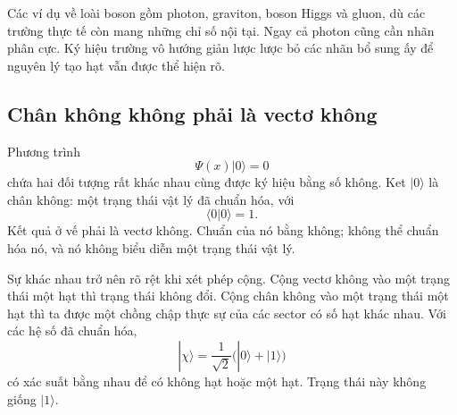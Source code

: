 \begin{classroomqa}\end{classroomqa}

Các ví dụ về loài boson gồm photon, graviton, boson Higgs và gluon, dù các trường thực tế còn mang những chỉ số nội tại. Ngay cả photon cũng cần nhãn phân cực. Ký hiệu trường vô hướng giản lược lược bỏ các nhãn bổ sung ấy để nguyên lý tạo hạt vẫn được thể hiện rõ.

\subsection{Chân không không phải là vectơ không}

Phương trình
\begin{equation}
\Psi(x)|0\rangle=0
\end{equation}
chứa hai đối tượng rất khác nhau cùng được ký hiệu bằng số không. Ket \(|0\rangle\) là chân không: một trạng thái vật lý đã chuẩn hóa, với
\begin{equation}
\langle0|0\rangle=1.
\end{equation}
Kết quả ở vế phải là vectơ không. Chuẩn của nó bằng không; không thể chuẩn hóa nó, và nó không biểu diễn một trạng thái vật lý.

Sự khác nhau trở nên rõ rệt khi xét phép cộng. Cộng vectơ không vào một trạng thái một hạt thì trạng thái không đổi. Cộng chân không vào một trạng thái một hạt thì ta được một chồng chập thực sự của các sector có số hạt khác nhau. Với các hệ số đã chuẩn hóa,
\begin{equation}
|\chi\rangle=\frac{1}{\sqrt2}\bigl(|0\rangle+|1\rangle\bigr)
\end{equation}
có xác suất bằng nhau để có không hạt hoặc một hạt. Trạng thái này không giống \(|1\rangle\).

\begin{classroomqa}
\end{classroomqa}

